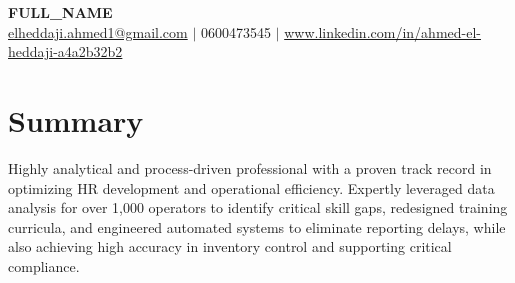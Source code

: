 \documentclass[a4paper,11pt]{article}
\begin{document}
\begin{center}
    {\Huge \scshape \textbf{FULL_NAME}} \\
    \vspace{5pt}
    \href{mailto:elheddaji.ahmed1@gmail.com}{elheddaji.ahmed1@gmail.com} $|$ 0600473545 $|$ \href{www.linkedin.com/in/ahmed-el-heddaji-a4a2b32b2}{www.linkedin.com/in/ahmed-el-heddaji-a4a2b32b2}
\end{center}

\section*{Summary}
Highly analytical and process-driven professional with a proven track record in optimizing HR development and operational efficiency. Expertly leveraged data analysis for over 1,000 operators to identify critical skill gaps, redesigned training curricula, and engineered automated systems to eliminate reporting delays, while also achieving high accuracy in inventory control and supporting critical compliance.\vspace{10pt}
\end{document}
